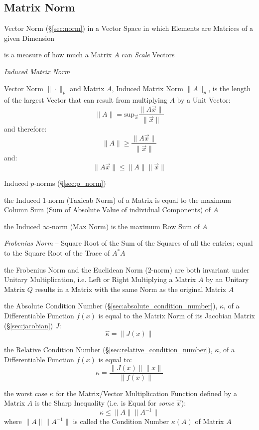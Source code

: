\subsection{Matrix Norm}\label{sec:matrix_norm}

Vector Norm (\S\ref{sec:norm}) in a Vector Space in which Elements are Matrices
of a given Dimension

is a measure of how much a Matrix $A$ can \emph{Scale} Vectors

\emph{Induced Matrix Norm}

Vector Norm $\|\cdot\|_p$ and Matrix $A$, Induced Matrix Norm $\|A\|_p$, is the
length of the largest Vector that can result from multiplying $A$ by a Unit
Vector:
\[
  \|A\| = \mathrm{sup}_{\vec{x}} \frac{\|A\vec{x}\|}{\|\vec{x}\|}
\]
and therefore:
\[
  \|A\| \geq \frac{\|A\vec{x}\|}{\|\vec{x}\|}
\]
and:
\[
  \|A\vec{x}\| \leq \|A\| \|\vec{x}\|
\]

Induced $p$-norms (\S\ref{sec:p_norm})

the Induced $1$-norm (Taxicab Norm) of a Matrix is equal to the maximum Column
Sum (Sum of Absolute Value of individual Components) of $A$

the Induced $\infty$-norm (Max Norm) is the maximum Row Sum of $A$


\emph{Frobenius Norm} -- Square Root of the Sum of the Squares of all the
entries; equal to the Square Root of the Trace of $A^*A$


the Frobenius Norm and the Euclidean Norm ($2$-norm) are both invariant under
Unitary Multiplication, i.e. Left or Right Multiplying a Matrix $A$ by an
Unitary Matrix $Q$ results in a Matrix with the same Norm as the original
Matrix $A$

the Absolute Condition Number (\S\ref{sec:absolute_condition_number}),
$\hat{\kappa}$, of a Differentiable Function $f(x)$ is equal to the Matrix Norm
of its Jacobian Matrix (\S\ref{sec:jacobian}) $J$:
\[
  \hat{\kappa} = \|J(x)\|
\]

the Relative Condition Number (\S\ref{sec:relative_condition_number}),
$\kappa$, of a Differentiable Function $f(x)$ is equal to:
\[
  \kappa = \frac{\|J(x)\| \|x\|}{\|f(x)\|}
\]

the worst case $\kappa$ for the Matrix/Vector Multiplication Function defined
by a Matrix $A$ is the Sharp Inequality (i.e. is Equal for \emph{some}
$\vec{x}$):
\[
  \kappa \leq \|A\|\|A^{-1}\|
\]
where $\|A\|\|A^{-1}\|$ is called the Condition Number $\kappa(A)$ of Matrix
$A$




